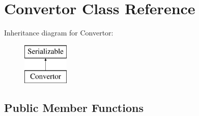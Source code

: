 \hypertarget{classConvertor}{\section{Convertor Class Reference}
\label{classConvertor}
}
Inheritance diagram for Convertor\-:\begin{figure}[H]
\begin{center}
\leavevmode
\includegraphics[height=2.000000cm]{classConvertor}
\end{center}
\end{figure}
\subsection*{Public Member Functions}
